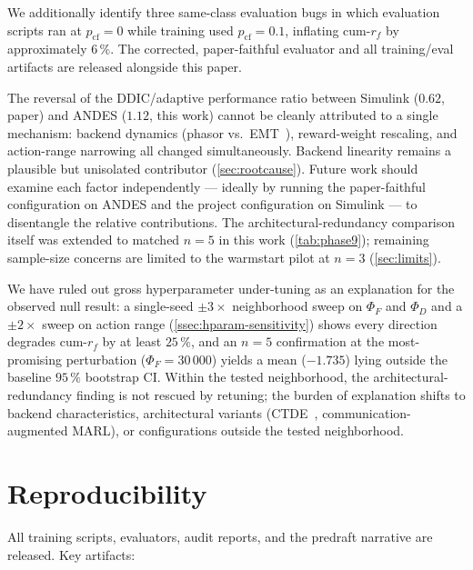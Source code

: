\documentclass[journal,onecolumn,11pt]{IEEEtran}
\begin{document}
We additionally identify three same-class evaluation bugs in which
evaluation scripts ran at $p_{\text{cf}} = 0$ while training used
$p_{\text{cf}} = 0.1$, inflating cum-$r_f$ by approximately $6\,\%$.
The corrected, paper-faithful evaluator and all training/eval
artifacts are released alongside this paper.

The reversal of the DDIC/adaptive performance ratio between Simulink
($0.62$, paper) and ANDES ($1.12$, this work) cannot be cleanly
attributed to a single mechanism: backend dynamics
(phasor vs.\ EMT~\cite{stiasny2023phasor,milano2020frequency}),
reward-weight rescaling, and action-range narrowing all changed
simultaneously. Backend linearity remains a plausible but unisolated
contributor (\cref{sec:rootcause}). Future work should examine each
factor independently --- ideally by running the paper-faithful
configuration on ANDES and the project configuration on Simulink ---
to disentangle the relative contributions. The
architectural-redundancy comparison itself was extended to matched
$n = 5$ in this work (\cref{tab:phase9}); remaining sample-size
concerns are limited to the warmstart pilot at $n = 3$ (\cref{sec:limits}).

We have ruled out gross hyperparameter under-tuning as an explanation
for the observed null result: a single-seed $\pm 3\times$ neighborhood
sweep on $\Phi_F$ and $\Phi_D$ and a $\pm 2\times$ sweep on action
range (\cref{ssec:hparam-sensitivity}) shows every direction degrades
cum-$r_f$ by at least $25\,\%$, and an $n = 5$ confirmation at the
most-promising perturbation ($\Phi_F = 30\,000$) yields a mean
($-1.735$) lying outside the baseline $95\,\%$ bootstrap CI. Within
the tested neighborhood, the architectural-redundancy finding is
not rescued by retuning; the burden of explanation shifts to
backend characteristics, architectural variants
(CTDE~\cite{glavic2017rl}, communication-augmented MARL), or
configurations outside the tested neighborhood.

\section*{Reproducibility}

All training scripts, evaluators, audit reports, and the predraft
narrative are released. Key artifacts:
\end{document}
